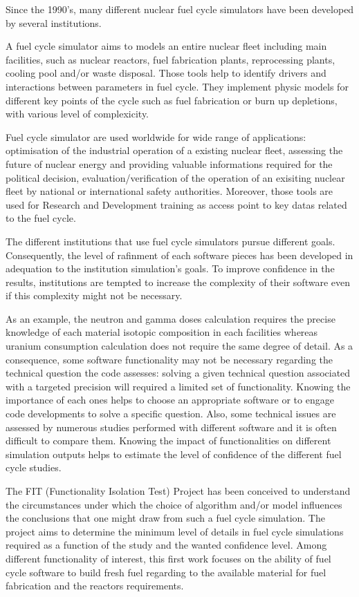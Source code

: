 Since the 1990's, many different nuclear fuel cycle simulators have been
developed by several institutions.

A fuel cycle simulator aims to models an entire nuclear fleet including main
facilities, such as nuclear reactors, fuel fabrication plants, reprocessing
plants, cooling pool and/or waste disposal. Those tools help to identify drivers
and interactions between parameters in fuel cycle. They implement physic models
for different key points of the cycle such as fuel fabrication or burn up
depletions, with various level of complexicity. 

Fuel cycle simulator are used worldwide for wide range of applications:
optimisation of the industrial operation of a existing nuclear fleet, assessing
the future of nuclear energy and providing valuable informations required for
the political decision, evaluation/verification of the operation of an exisiting
nuclear fleet by national or international safety authorities. Moreover, those
tools are used for Research and Development training as access point to key
datas related to the fuel cycle. 

The different institutions that use fuel cycle simulators pursue different
goals. Consequently, the level of rafinment of each software pieces has been
developed in adequation to the institution simulation's goals. To improve
confidence in the results, institutions are tempted to increase the complexity
of their software even if this complexity might not be necessary.

As an example, the neutron and gamma doses calculation requires the precise
knowledge of each material isotopic composition in each facilities whereas
uranium consumption calculation does not require the same degree of detail. As a
consequence, some software functionality may not be necessary regarding the
technical question the code assesses: solving a given technical question
associated with a targeted precision will required a limited set of
functionality. Knowing the importance of each ones helps to choose an
appropriate software or to engage code developments to solve a specific
question. Also, some technical issues are assessed by numerous studies performed
with different software and it is often difficult to compare them. Knowing the
impact of functionalities on different simulation outputs helps to estimate the
level of confidence of the different fuel cycle studies.

The FIT (Functionality Isolation Test) Project has been conceived to understand
the circumstances under which the choice of algorithm and/or model influences
the conclusions that one might draw from such a fuel cycle simulation. The
project aims to determine the minimum level of details in fuel cycle simulations
required as a function of the study and the wanted confidence level. Among
different functionality of interest, this first work focuses on the ability of
fuel cycle software to build fresh fuel regarding to the available material for
fuel fabrication and the reactors requirements.

